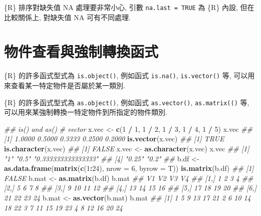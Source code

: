 \documentclass[
]{book}
\newenvironment{Shaded}{\begin{snugshade}}{\end{snugshade}}
\newcommand{\CommentTok}[1]{\textcolor[rgb]{0.56,0.35,0.01}{\textit{#1}}}
\newcommand{\DataTypeTok}[1]{\textcolor[rgb]{0.13,0.29,0.53}{#1}}
\newcommand{\DecValTok}[1]{\textcolor[rgb]{0.00,0.00,0.81}{#1}}
\newcommand{\KeywordTok}[1]{\textcolor[rgb]{0.13,0.29,0.53}{\textbf{#1}}}
\newcommand{\NormalTok}[1]{#1}
\newcommand{\OperatorTok}[1]{\textcolor[rgb]{0.81,0.36,0.00}{\textbf{#1}}}
\newcommand{\StringTok}[1]{\textcolor[rgb]{0.31,0.60,0.02}{#1}}
\begin{document}
\{R\} 排序對缺失值 NA 處理要非常小心,
引數 \texttt{na.last\ =\ TRUE} 為 \{R\} 內設,
但在比較關係上, 對缺失值 NA 可有不同處理.

\hypertarget{ux7269ux4ef6ux67e5ux770bux8207ux5f37ux5236ux8f49ux63dbux51fdux5f0f}{%
\section{物件查看與強制轉換函式}\label{ux7269ux4ef6ux67e5ux770bux8207ux5f37ux5236ux8f49ux63dbux51fdux5f0f}}

\{R\} 的許多函式型式為
\texttt{is.object()},
例如函式
\texttt{is.na()},
\texttt{is.vector()}
等,
可以用來查看某一特定物件是否屬於某一類別.

\{R\} 的許多函式型式為
\texttt{as.object()},
例如函式
\texttt{as.vector()},
\texttt{as.matrix(()}
等,
可以用來某強制轉換一特定物件到所指定的物件類別.

\begin{Shaded}
\begin{Highlighting}[]
\CommentTok{\#\# is() and as()}
\CommentTok{\# vector}
\NormalTok{x.vec \textless{}{-}}\StringTok{ }\KeywordTok{c}\NormalTok{(}\DecValTok{1} \OperatorTok{/}\StringTok{ }\DecValTok{1}\NormalTok{, }\DecValTok{1} \OperatorTok{/}\StringTok{ }\DecValTok{2}\NormalTok{, }\DecValTok{1} \OperatorTok{/}\StringTok{ }\DecValTok{3}\NormalTok{, }\DecValTok{1} \OperatorTok{/}\StringTok{ }\DecValTok{4}\NormalTok{, }\DecValTok{1} \OperatorTok{/}\StringTok{ }\DecValTok{5}\NormalTok{)}
\NormalTok{x.vec}
\CommentTok{\#\# [1] 1.0000 0.5000 0.3333 0.2500 0.2000}
\KeywordTok{is.vector}\NormalTok{(x.vec)}
\CommentTok{\#\# [1] TRUE}
\KeywordTok{is.character}\NormalTok{(x.vec)}
\CommentTok{\#\# [1] FALSE}
\NormalTok{x.vec \textless{}{-}}\StringTok{ }\KeywordTok{as.character}\NormalTok{(x.vec)}
\NormalTok{x.vec}
\CommentTok{\#\# [1] "1"                 "0.5"               "0.333333333333333"}
\CommentTok{\#\# [4] "0.25"              "0.2"}
\CommentTok{\#\#}
\NormalTok{b.df \textless{}{-}}\StringTok{ }\KeywordTok{as.data.frame}\NormalTok{(}\KeywordTok{matrix}\NormalTok{(}\KeywordTok{c}\NormalTok{(}\DecValTok{1}\OperatorTok{:}\DecValTok{24}\NormalTok{), }\DataTypeTok{nrow =} \DecValTok{6}\NormalTok{, }\DataTypeTok{byrow =}\NormalTok{ T))}
\KeywordTok{is.matrix}\NormalTok{(b.df)}
\CommentTok{\#\# [1] FALSE}
\NormalTok{b.mat \textless{}{-}}\StringTok{ }\KeywordTok{as.matrix}\NormalTok{(b.df)}
\NormalTok{b.mat}
\CommentTok{\#\#      V1 V2 V3 V4}
\CommentTok{\#\# [1,]  1  2  3  4}
\CommentTok{\#\# [2,]  5  6  7  8}
\CommentTok{\#\# [3,]  9 10 11 12}
\CommentTok{\#\# [4,] 13 14 15 16}
\CommentTok{\#\# [5,] 17 18 19 20}
\CommentTok{\#\# [6,] 21 22 23 24}
\NormalTok{b.mat \textless{}{-}}\StringTok{ }\KeywordTok{as.vector}\NormalTok{(b.mat)}
\NormalTok{b.mat}
\CommentTok{\#\#  [1]  1  5  9 13 17 21  2  6 10 14 18 22  3  7 11 15 19 23  4  8 12 16 20 24}
\end{Highlighting}
\end{Shaded}
\end{document}
